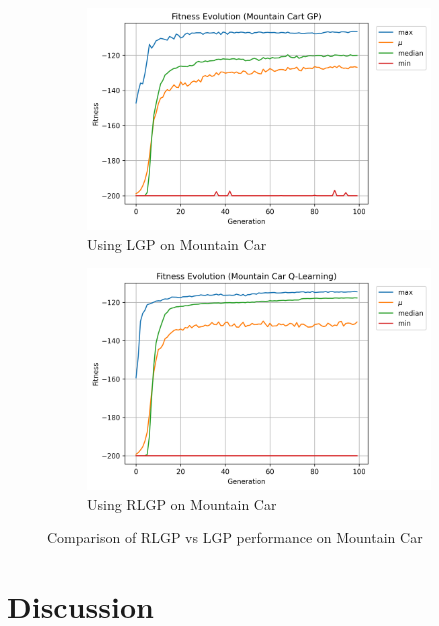 \documentclass[12pt, final]{dalcsthesis}
\begin{document}
\begin{figure}[b]
	\centering
	\begin{subfigure}{1.0\textwidth}
		\includegraphics[width=\linewidth]{mountain_car_lgp.png}
		\caption{Using LGP on Mountain Car}
		\label{fig:mountain-car-lgp}
	\end{subfigure}
	\hfill
	\begin{subfigure}{1.0\textwidth}
		\includegraphics[width=\linewidth]{mountain_car_q.png}
		\caption{Using RLGP on Mountain Car}
		\label{fig:mountain-car-q}
	\end{subfigure}
	\caption{Comparison of RLGP vs LGP performance on Mountain Car}
	\label{fig:mountain-car-comparison}
\end{figure}


\section{Discussion}
\end{document}
